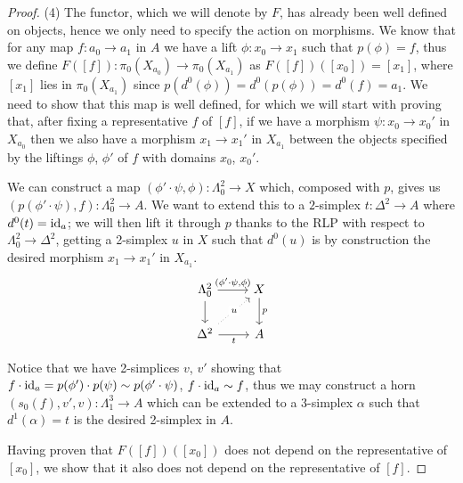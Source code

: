 \documentclass[a4paper,11pt,openany]{scrartcl}
\begin{document}
\begin{proof}
    (4) The functor, which we will denote by $F$, has already been well defined
    on objects, hence we only need to specify the action on morphisms. We know
    that for any map $f\colon a_0\rightarrow a_1$ in $A$ we have a lift
    $\phi\colon x_0\rightarrow x_1$ such that $p(\phi)=f$, thus we define
    $F([f])\colon\pi_0(X_{a_0})\rightarrow\pi_0(X_{a_1})$ as
    $F([f])([x_0])=[x_1]$, where $[x_1]$ lies in $\pi_0(X_{a_1})$ since
    $p(d^0(\phi))=d^0(p(\phi))=d^0(f)=a_1$.
    We need to show that this map is well defined, for which we will start with
    proving that, after fixing a representative $f$ of $[f]$, if we have a
    morphism $\psi\colon x_0\rightarrow x_0'$ in $X_{a_0}$ then we also have a
    morphism $x_1\rightarrow x_1'$ in $X_{a_1}$ between the objects specified by
    the liftings $\phi$, $\phi'$ of $f$ with domains $x_0$, $x_0'$.

    We can construct a map
    $(\phi'\cdot\psi,\phi)\colon\Lambda^2_0\rightarrow X$ which, composed
    with $p$, gives us $(p(\phi'\cdot\psi),f)\colon\Lambda^2_0\rightarrow A$. We
    want to extend this to a $2$-simplex $t\colon\Delta^2\rightarrow A$ where
    $d^0(t)=\operatorname{id}_a$; we will then lift it through $p$ thanks to the RLP with
    respect to $\Lambda^2_0\rightarrow\Delta^2$, getting a 2-simplex $u$ in $X$
    such that $d^0(u)$ is by construction the desired morphism $x_1\rightarrow
    x_1'$ in $X_{a_1}$.
    \[\begin{tikzcd}
        {\Lambda^2_0} & X \\
        {\Delta^2} & A
        \arrow["{(\phi'\cdot\psi,\phi)}", from=1-1, to=1-2]
        \arrow["p", from=1-2, to=2-2]
        \arrow["t"', from=2-1, to=2-2]
        \arrow[from=1-1, to=2-1]
        \arrow["{u}"{description}, dotted, from=2-1, to=1-2]
    \end{tikzcd}\]

    Notice that we have 2-simplices $v$, $v'$ showing that
    $f\cdot\operatorname{id}_a=p(\phi')\cdot p(\psi)\sim p(\phi'\cdot\psi)$, $f\cdot\operatorname{id}_a\sim
    f$, thus we may construct a horn $(s_0(f),v',v)\colon\Lambda^3_1\rightarrow
    A$ which can be extended to a 3-simplex $\alpha$ such that $d^1(\alpha)=t$
    is the desired 2-simplex in $A$.

    Having proven that $F([f])([x_0])$ does not depend on the representative of
    $[x_0]$, we show that it also does not depend on the representative of
    $[f]$.


\end{proof}
\end{document}

